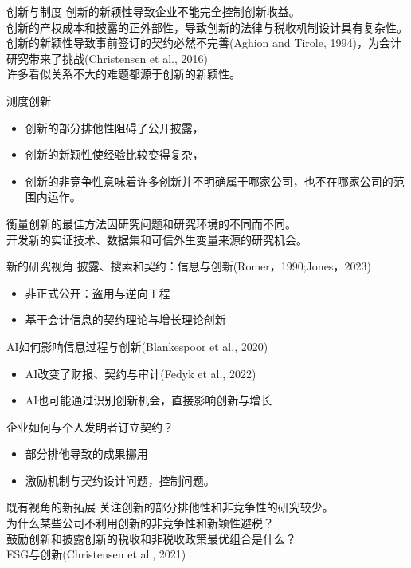 \documentclass{beamer}
\begin{document}
\begin{frame}{创新与制度}
	创新的新颖性导致企业不能完全控制创新收益。\\
	创新的产权成本和披露的正外部性，导致创新的法律与税收机制设计具有复杂性。\\
	创新的新颖性导致事前签订的契约必然不完善(Aghion and Tirole, 1994)，为会计研究带来了挑战(Christensen et al., 2016)\\
	\alert{许多看似关系不大的难题都源于创新的新颖性。}
\end{frame}

\begin{frame}{测度创新}
	\begin{itemize}
		\item 创新的部分排他性阻碍了公开披露，
		\item 创新的新颖性使经验比较变得复杂，
		\item 创新的非竞争性意味着许多创新并不明确属于哪家公司，也不在哪家公司的范围内运作。
	\end{itemize}
	衡量创新的最佳方法因研究问题和研究环境的不同而不同。\\
	开发新的实证技术、数据集和可信外生变量来源的研究机会。
\end{frame}

\begin{frame}{新的研究视角}
	披露、搜索和契约：信息与创新(Romer，1990;Jones，2023)\\
	\begin{itemize}
		\item 非正式公开：盗用与逆向工程
		\item 基于会计信息的契约理论与增长理论创新
	\end{itemize}
	AI如何影响信息过程与创新(Blankespoor et al., 2020)
	\begin{itemize}
		\item[] AI改变了财报、契约与审计(Fedyk et al., 2022)
		\item[] AI也可能通过识别创新机会，直接影响创新与增长
	\end{itemize}
	企业如何与个人发明者订立契约？
	\begin{itemize}
		\item 部分排他导致的成果挪用
		\item 激励机制与契约设计问题，控制问题。
	\end{itemize}
\end{frame}

\begin{frame}{既有视角的新拓展}
	关注创新的部分排他性和非竞争性的研究较少。\\
	为什么某些公司不利用创新的非竞争性和新颖性避税？\\
	鼓励创新和披露创新的税收和非税收政策最优组合是什么？\\
	ESG与创新(Christensen et al., 2021)
\end{frame}
\end{document}
